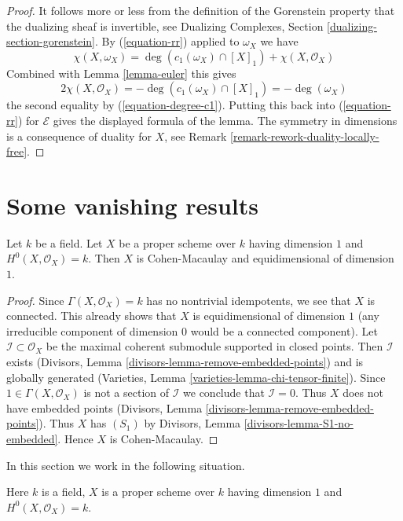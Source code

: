 \begin{proof}
It follows more or less from the definition of the Gorenstein property
that the dualizing sheaf is invertible, see
Dualizing Complexes, Section \ref{dualizing-section-gorenstein}.
By (\ref{equation-rr}) applied to $\omega_X$ we have
$$
\chi(X, \omega_X) = 
\deg(c_1(\omega_X) \cap [X]_1) + \chi(X, \mathcal{O}_X)
$$
Combined with Lemma \ref{lemma-euler} this gives
$$
2\chi(X, \mathcal{O}_X) = - \deg(c_1(\omega_X) \cap [X]_1) = - \deg(\omega_X)
$$
the second equality by (\ref{equation-degree-c1}). Putting this back into
(\ref{equation-rr}) for $\mathcal{E}$ gives the displayed formula of the lemma.
The symmetry in dimensions is a consequence of duality for $X$, see
Remark \ref{remark-rework-duality-locally-free}.
\end{proof}




\section{Some vanishing results}
\label{section-vanishing}

\begin{lemma}
\label{lemma-automatic}
Let $k$ be a field. Let $X$ be a proper scheme over $k$ having dimension $1$
and $H^0(X, \mathcal{O}_X) = k$. Then $X$ is Cohen-Macaulay
and equidimensional of dimension $1$.
\end{lemma}

\begin{proof}
Since $\Gamma(X, \mathcal{O}_X) = k$ has no nontrivial idempotents,
we see that $X$ is connected. This already shows that $X$ is
equidimensional of dimension $1$ (any irreducible component
of dimension $0$ would be a connected component).
Let $\mathcal{I} \subset \mathcal{O}_X$
be the maximal coherent submodule supported in closed points.
Then $\mathcal{I}$ exists
(Divisors, Lemma \ref{divisors-lemma-remove-embedded-points})
and is globally generated
(Varieties, Lemma \ref{varieties-lemma-chi-tensor-finite}).
Since $1 \in \Gamma(X, \mathcal{O}_X)$ is not a section
of $\mathcal{I}$ we conclude that $\mathcal{I} = 0$.
Thus $X$ does not have embedded points
(Divisors, Lemma \ref{divisors-lemma-remove-embedded-points}).
Thus $X$ has $(S_1)$ by
Divisors, Lemma \ref{divisors-lemma-S1-no-embedded}.
Hence $X$ is Cohen-Macaulay.
\end{proof}

\noindent
In this section we work in the following situation.

\begin{situation}
\label{situation-Cohen-Macaulay-curve}
Here $k$ is a field, $X$ is a proper scheme over $k$ having dimension $1$
and $H^0(X, \mathcal{O}_X) = k$.
\end{situation}

